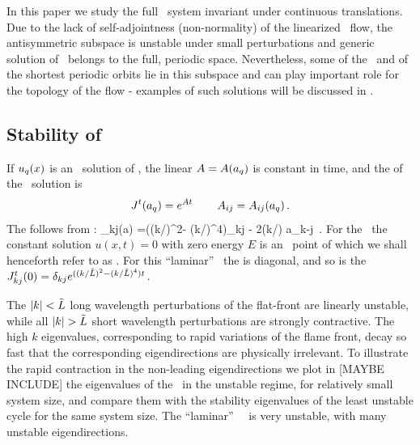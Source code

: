 In this paper we study the full \KS\ system invariant
under continuous translations. Due to the lack of self-adjointness
(non-normality) of the linearized \KS\ flow,
the antisymmetric subspace
is unstable under small perturbations and generic solution of
\KSe\ belongs to the full, periodic space. Nevertheless, some of
the \eqva\ and of the shortest periodic orbits lie in this subspace
and can play important role for the topology of the flow - examples
of such solutions will be discussed in .


\subsection{Stability of \eqva}
\label{s:StabEqui}

If $u_q(x)$ is an \eqv\ solution of \KSe,
the linear {\stabmat}
${A}={A}(a_q)$
is constant in time,
and
the {\jacobianM}
of the \eqv\ solution is
\[
 {J}^t(a_q) = e^{{A} t}
    \,\qquad
 A_{ij}= A_{ij}(a_q)
\,.
\]
The {\stabmat}
follows from :
\beq
{\Mvar}_{kj}(a) %
=((k/\tildeL)^2- (k/\tildeL)^4)\delta_{kj} - 2(k/\tildeL) a_{k-j}
\,.
For the \KSe\ the constant solution $u(x,t)=0$ with zero energy $E$ is an
\eqv\ point of  which we shall henceforth refer to as
. For this ``laminar'' \eqv\ the {\stabmat}
is diagonal, and
so is the {\jacobianM}
$
{J}^t_{kj}(0) = \delta_{kj} e^{((k/\tilde{L})^2- (k/\tilde{L})^4)t}
\,.
$

The $|k|<\tilde{L}$
long wavelength perturbations of the flat-front {\eqv}
are linearly unstable, while all
$|k|> \tildeL$ short wavelength perturbations are strongly contractive.
The high $k$ eigenvalues, corresponding to rapid variations of
the flame front, decay so fast that the corresponding eigendirections
are physically irrelevant.
To illustrate the rapid contraction in the non-leading eigendirections
we plot  in [MAYBE INCLUDE] %
the eigenvalues of the \eqv\ in the unstable regime,
for relatively small system size, %
and compare them with the
stability eigenvalues of the least unstable cycle for the same
system size.
The ``laminar'' ~\eqv\ is very unstable,
with many unstable eigendirections.


